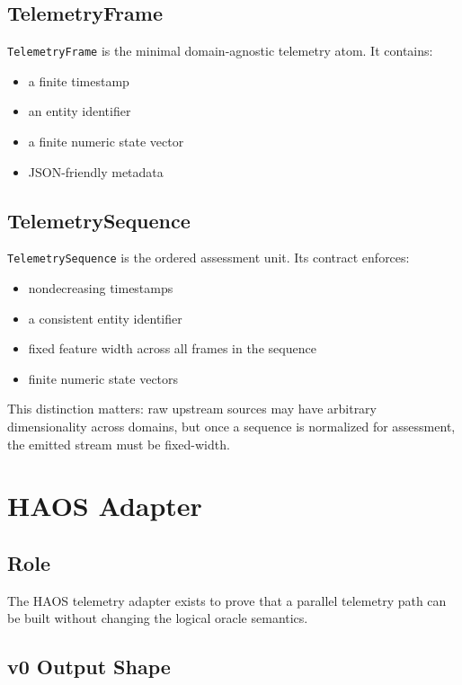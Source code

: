 \documentclass[11pt]{article}
\begin{document}
\subsection{TelemetryFrame}

\texttt{TelemetryFrame} is the minimal domain-agnostic telemetry atom.
It contains:

\begin{itemize}
\item a finite timestamp
\item an entity identifier
\item a finite numeric state vector
\item JSON-friendly metadata
\end{itemize}

\subsection{TelemetrySequence}

\texttt{TelemetrySequence} is the ordered assessment unit.
Its contract enforces:

\begin{itemize}
\item nondecreasing timestamps
\item a consistent entity identifier
\item fixed feature width across all frames in the sequence
\item finite numeric state vectors
\end{itemize}

This distinction matters:
raw upstream sources may have arbitrary dimensionality across domains, but once a sequence is normalized for assessment, the emitted stream must be fixed-width.

\section{HAOS Adapter}

\subsection{Role}

The HAOS telemetry adapter exists to prove that a parallel telemetry path can be built without changing the logical oracle semantics.

\subsection{v0 Output Shape}
\end{document}
